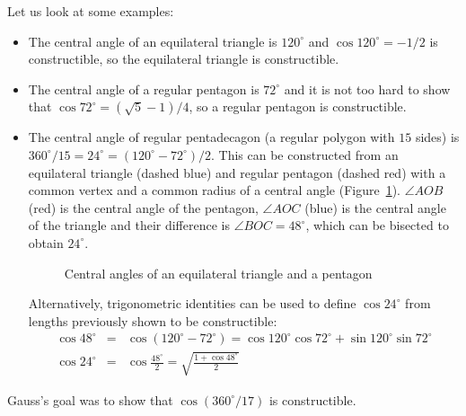 \documentclass[a4paper,11pt]{article}
\begin{document}
Let us look at some examples:
\begin{itemize}
\item The central angle of an equilateral triangle is $120^\circ$ and $\cos 120^\circ=-1/2$ is constructible, so the equilateral triangle is constructible.
\item The central angle of a regular pentagon is $72^\circ$ and it is not too hard to show that $\cos 72^{\circ}=(\sqrt{5}-1)/4$, so a regular pentagon is constructible.
\item The central angle of regular pentadecagon (a regular polygon with $15$ sides) is $360^\circ/15=24^\circ=(120^\circ-72^\circ)/2$. This can be constructed from an equilateral triangle (dashed blue) and regular pentagon (dashed red) with a common vertex and a common radius of a central angle (Figure~\ref{fig.central}). $\angle AOB$ (red) is the central angle of the pentagon, $\angle AOC$ (blue) is the central angle of the triangle and their difference is $\angle BOC=48^\circ$, which can be bisected to obtain $24^\circ$.

\begin{figure}[htb]
\begin{center}
\caption{Central angles of an equilateral triangle and a pentagon}\label{fig.central}
\end{center}
\end{figure}
Alternatively, trigonometric identities can be used to define $\cos 24^\circ$ from lengths previously shown to be constructible:
\begin{eqnarray*}
\cos 48^\circ &=& \cos (120^\circ- 72^\circ) = \cos 120^\circ \cos 72^\circ +\sin 120^\circ \sin 72^\circ\\
\cos 24^\circ &=& \cos \frac{48^\circ}{2} = \sqrt{\frac{1+\cos 48^\circ}{2}}
\end{eqnarray*}
\end{itemize}
Gauss's goal was to show that $\cos (360^\circ/17)$ is constructible.
\end{document}
